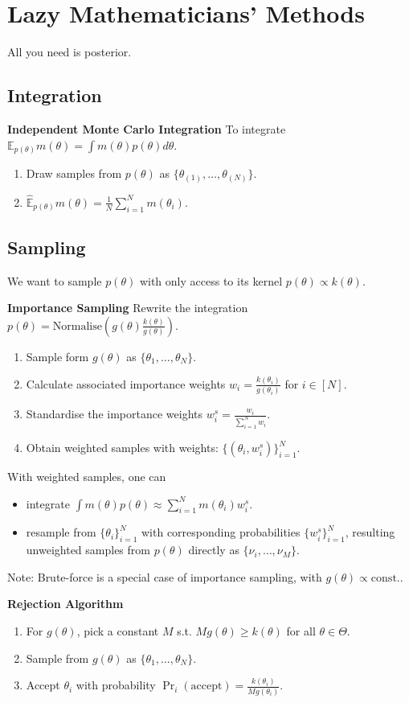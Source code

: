 \documentclass[5pt,a4paper, twocolumn]{article}
\newcommand{\topic}[1]{\section*{#1}}
\newcommand{\subtopic}[1]{\subsection*{#1}}
\newcommand{\keypoint}[1]{\textbf{#1}}
\begin{document}
{\topic{Lazy Mathematicians' Methods}
All you need is posterior.
\subtopic{Integration}
\keypoint{Independent Monte Carlo Integration} To integrate $\mathbb{E}_{p(\theta)}m(\theta) = \int m(\theta) p(\theta)d\theta$.

\begin{enumerate}
    \item Draw samples from $p(\theta)$ as $\{\theta_{(1)}, \dots, \theta_{(N)}\}$.
    \item $\hat{\mathbb{E}}_{p(\theta)} m(\theta) = \frac{1}{N}\sum_{i=1}^N m(\theta_{i})$.
\end{enumerate}

\subtopic{Sampling}
We want to sample $p(\theta)$ with only access to its kernel $p(\theta) \propto k(\theta)$.

\keypoint{Importance Sampling} Rewrite the integration $p(\theta)=\text{Normalise}(g(\theta)\frac{k(\theta)}{g(\theta)})$.
\begin{enumerate}
    \item Sample form $g(\theta)$ as $\{\theta_1, \dots, \theta_N\}$.
    \item Calculate associated importance weights $w_i=\frac{k(\theta_i)}{g(\theta_i)}$ for $i\in[N]$.
    \item Standardise the importance weights $w^s_i = \frac{w_i}{\sum_{i=1}^N w_i}$.
    \item Obtain weighted samples with weights: $\{(\theta_i, w^s_i)\}^N_{i=1}$.
\end{enumerate}

With weighted samples, one can
\begin{itemize}
    \item integrate $\int m(\theta)p(\theta) \approx \sum_{i=1}^N m(\theta_i)w_i^s$.
    \item resample from $\{\theta_i\}^N_{i=1}$ with corresponding probabilities $\{w_i^s\}_{i=1}^N$, resulting unweighted samples from $p(\theta)$ directly as $\{\nu_i, \dots, \nu_M\}$.
\end{itemize}
Note: Brute-force is a special case of importance sampling, with $g(\theta) \propto \text{const.}$.

\keypoint{Rejection Algorithm}
\begin{enumerate}
    \item For $g(\theta)$, pick a constant $M$ s.t. $Mg(\theta) \geq k(\theta)$ for all $\theta\in\Theta$.
    \item Sample from $g(\theta)$ as $\{\theta_1, \dots, \theta_N\}$.
    \item Accept $\theta_i$ with probability $\Pr_i(\text{accept})=\frac{k(\theta_i)}{Mg(\theta_i)}$.
\end{enumerate}

}
\end{document}
